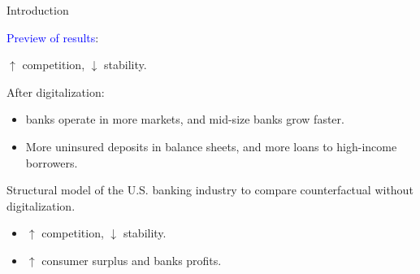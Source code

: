 \documentclass[notes,10pt, aspectratio=169]{beamer}
\newenvironment{wideitemize}{\itemize\addtolength{\itemsep}{10pt}}{\enditemize}
\begin{document}
\begin{frame}{Introduction}

    \begin{wideitemize}
      
        \item \textcolor{blue}{Preview of results}:

        \vspace{0.2cm}
        \begin{wideitemize}
            \vspace{0.2cm}
            \item  $\uparrow$ competition, $\downarrow$ stability.
            \item After digitalization:
            \vspace{0.2cm}
            \begin{itemize} 
                \item banks operate in more markets, and mid-size banks grow faster.
            \item More uninsured deposits in balance sheets, and more loans to high-income borrowers.
            \end{itemize}
            \item Structural model of the U.S. banking industry to compare counterfactual without digitalization.

            \begin{itemize}
                \vspace{0.2cm}
                \item $\uparrow$ competition, $\downarrow$ stability.
                \item $\uparrow$ consumer surplus and banks profits. 

            \end{itemize}

        \end{wideitemize}


    \end{wideitemize}
\end{frame}
\end{document}
